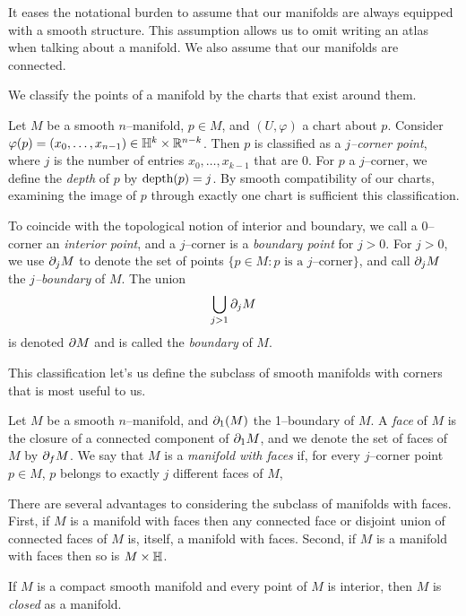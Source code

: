 It eases the notational burden to assume that our manifolds are always equipped with a smooth structure.
This assumption allows us to omit writing an atlas when talking about a manifold.
We also assume that our manifolds are connected.

We classify the points of a manifold by the charts that exist around them.

\begin{defn}
	Let $M$ be a smooth $n$--manifold, $p\in M$, and $(U,\varphi)$ a chart about $p$.
	Consider $\varphi(p)=(x_0,\dots,x_{n-1})\in \mathbb{H}^k\times\mathbb{R}^{n-k}$.
	Then $p$ is classified as a \emph{$j$--corner point}, where $j$ is the number of entries $x_0,\dots,x_{k-1}$ that are 0.
	For $p$ a $j$--corner, we define the \emph{depth} of $p$ by ${\textrm{depth}(p)}=j$.
	By smooth compatibility of our charts, examining the image of $p$ through exactly one chart is sufficient this classification.
	
	To coincide with the topological notion of interior and boundary, we call a $0$--corner an \emph{interior point}, and a $j$--corner is a \emph{boundary point} for $j>0$.
	For $j>0$, we use $\partial_j M$ to denote the set of points $\{p\in M:p\textrm{ is a }j\textrm{--corner}\}$, and call $\partial_j M$ the \emph{$j$--boundary} of $M$.
	The union $$\bigcup_{j>1} \partial_j M$$ is denoted $\partial M$ and is called the \emph{boundary} of $M$.
\end{defn}	

This classification let's us define the subclass of smooth manifolds with corners that is most useful to us.

\begin{defn}
	Let $M$ be a smooth $n$--manifold, and $\partial_1(M)$ the 1--boundary of $M$.
	A \emph{face} of $M$ is the closure of a connected component of $\partial_1 M$, and we denote the set of faces of $M$ by $\partial_f M$.
	We say that $M$ is a \emph{manifold with faces} if, for every $j$--corner point $p\in M$, $p$ belongs to exactly $j$ different faces of $M$,
\end{defn}

There are several advantages to considering the subclass of manifolds with faces.
First, if $M$ is a manifold with faces then any connected face or disjoint union of connected faces of $M$ is, itself, a manifold with faces.
Second, if $M$ is a manifold with faces then so is $M\times \mathbb{H}$.
	
\begin{defn}
	If $M$ is a compact smooth manifold and every point of $M$ is interior, then $M$ is \emph{closed} as a manifold.
\end{defn}

